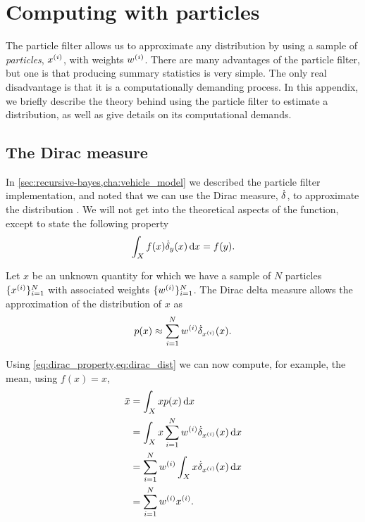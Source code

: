\chapter{Computing with particles}
\label{app:computing-with-particles}

\phantom{\gps{}\gps{}\gps{}}

The particle filter allows us to approximate any distribution by using a sample of \emph{particles}, $x^{(i)}$, with weights $w^{(i)}$. There are many advantages of the particle filter, but one is that producing summary statistics is very simple. The only real disadvantage is that it is a computationally demanding process. In this appendix, we briefly describe the theory behind using the particle filter to estimate a distribution, as well as give details on its computational demands.


\section{The Dirac measure}
\label{app:dirac-delta-measure}

In \cref{sec:recursive-bayes,cha:vehicle_model} we described the particle filter implementation, and noted that we can use the Dirac measure, $\dot\delta$, to approximate the distribution \citep{Benedetto_1996}. We will not get into the theoretical aspects of the function, except to state the following property
\:
\begin{equation}
\label{eq:dirac_property}
\int_X f(x) \dot\delta_y(x)\,\mathrm{d}x = f(y).
\end{equation}

Let $x$ be an unknown quantity for which we have a sample of $N$ particles $\{x^{(i)}\}_{i=1}^N$ with associated weights $\{w^{(i)}\}_{i=1}^N$. The Dirac delta measure allows the approximation of the distribution of $x$ as
\begin{equation}
\label{eq:dirac_dist}
p(x) \approx \sum_{i=1}^N w^{(i)} \dot\delta_{x^{(i)}}(x).
\end{equation}


Using \cref{eq:dirac_property,eq:dirac_dist} we can now compute, for example, the mean, using $f(x) = x$,
\begin{equation}
\label{eq:dirac_mean}
\begin{split}
\bar x &= \int_X x p(x) \,\mathrm{d}x \\
&= \int_X x \sum_{i=1}^N w^{(i)} \dot\delta_{x^{(i)}}(x) \,\mathrm{d}x \\
&= \sum_{i=1}^N w^{(i)} \int_X x \dot\delta_{x^{(i)}}(x) \,\mathrm{d}x \\
&= \sum_{i=1}^N w^{(i)} x^{(i)}.
\end{split}
\end{equation}



